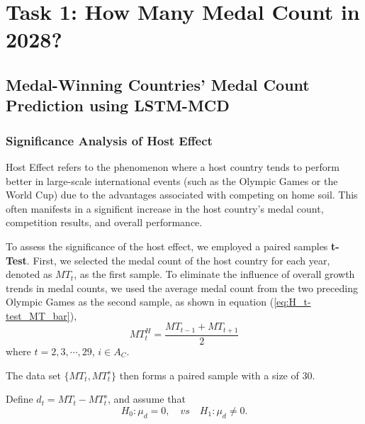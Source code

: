 \documentclass{mcmthesis}
\begin{document}
	
	
	
	
	\newpage
	\section{Task 1: How Many Medal Count in 2028? }
	\subsection{Medal-Winning Countries' Medal Count Prediction using LSTM-MCD}
	
	\subsubsection{Significance Analysis of Host Effect}
	
Host Effect refers to the phenomenon where a host country tends to perform better in large-scale international events (such as the Olympic Games or the World Cup) due to the advantages associated with competing on home soil. This often manifests in a significnt increase in the host country's medal count, competition results, and overall performance.

	
	To assess the significance of the host effect, we employed a paired samples  \textbf{t-Test}. First, we selected the medal count of the host country for each year, denoted as $MT_{t}$, as the first sample. To eliminate the influence of overall growth trends in medal counts, we used the average medal count from the two preceding Olympic Games as the second sample, as shown in equation (\ref{eq:H_t-test_MT_bar}),
	\begin{equation}
		MT^H_{t}=\frac{ MT_{t-1} + MT_{t+1} }{2}
		\label{eq:H_t-test_MT_bar}
	\end{equation}
	where $t=2,3,\cdots,29$, $i\in A_{C}$. 
	
	The data set $\{MT_{t},MT^s_{t}\}$ then forms a paired sample with a size of 30. 
	
	Define $d_t= MT_{t} - MT^s_{t}$, and assume that
	\begin{equation*}
		H_0: \mu_d=0, \quad vs \quad H_1:  \mu_d \ne 0.
	\end{equation*}
	
\end{document}
